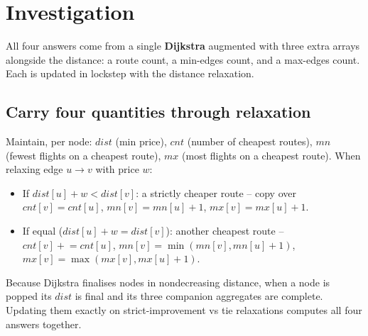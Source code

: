 \section{Investigation}
\label{sec:cses-investigation}


\begin{patternbox}
All four answers come from a single \textbf{Dijkstra} augmented with three
extra arrays alongside the distance: a route count, a min-edges count, and a
max-edges count. Each is updated in lockstep with the distance relaxation.
\end{patternbox}

\subsection*{Carry four quantities through relaxation}

Maintain, per node: $\textit{dist}$ (min price), $\textit{cnt}$ (number of
cheapest routes), $\textit{mn}$ (fewest flights on a cheapest route),
$\textit{mx}$ (most flights on a cheapest route). When relaxing edge
$u\to v$ with price $w$:
\begin{itemize}
  \item If $\textit{dist}[u]+w<\textit{dist}[v]$: a strictly cheaper route
        -- copy over $\textit{cnt}[v]=\textit{cnt}[u]$, $\textit{mn}[v]=
        \textit{mn}[u]+1$, $\textit{mx}[v]=\textit{mx}[u]+1$.
  \item If equal ($\textit{dist}[u]+w=\textit{dist}[v]$): another cheapest
        route -- $\textit{cnt}[v]\mathrel{+}=\textit{cnt}[u]$,
        $\textit{mn}[v]=\min(\textit{mn}[v],\textit{mn}[u]+1)$,
        $\textit{mx}[v]=\max(\textit{mx}[v],\textit{mx}[u]+1)$.
\end{itemize}

\begin{ideabox}
Because Dijkstra finalises nodes in nondecreasing distance, when a node is
popped its $\textit{dist}$ is final and its three companion aggregates are
complete. Updating them exactly on strict-improvement vs tie relaxations
computes all four answers together.
\end{ideabox}


